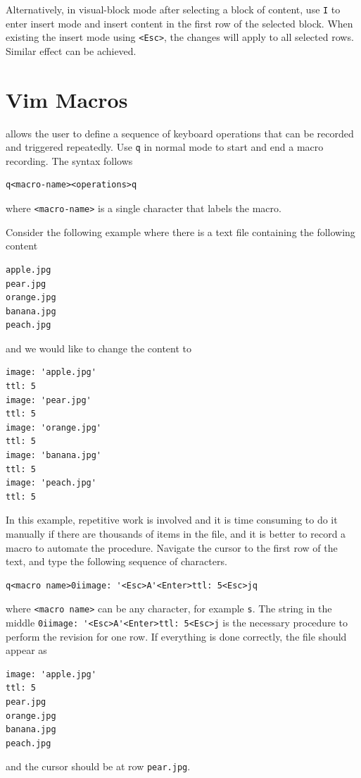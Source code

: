 Alternatively, in visual-block mode after selecting a block of content, use \verb|I| to enter insert mode and insert content in the first row of the selected block. When existing the insert mode using \verb|<Esc>|, the changes will apply to all selected rows. Similar effect can be achieved.

\section{Vim Macros}

 allows the user to define a sequence of keyboard operations that can be recorded and triggered repeatedly. Use \verb|q| in normal mode to start and end a macro recording. The syntax follows
\begin{lstlisting}
q<macro-name><operations>q
\end{lstlisting}
where \verb|<macro-name>| is a single character that labels the macro.

Consider the following example where there is a text file containing the following content
\begin{lstlisting}
apple.jpg
pear.jpg
orange.jpg
banana.jpg
peach.jpg
\end{lstlisting}
and we would like to change the content to
\begin{lstlisting}
image: 'apple.jpg'
ttl: 5
image: 'pear.jpg'
ttl: 5
image: 'orange.jpg'
ttl: 5
image: 'banana.jpg'
ttl: 5
image: 'peach.jpg'
ttl: 5
\end{lstlisting}

In this example, repetitive work is involved and it is time consuming to do it manually if there are thousands of items in the file, and it is better to record a macro to automate the procedure. Navigate the cursor to the first row of the text, and type the following sequence of characters.
\begin{lstlisting}
q<macro name>0iimage: '<Esc>A'<Enter>ttl: 5<Esc>jq
\end{lstlisting}
where \verb|<macro name>| can be any character, for example \verb|s|. The string in the middle \verb|0iimage: '<Esc>A'<Enter>ttl: 5<Esc>j| is the necessary procedure to perform the revision for one row. If everything is done correctly, the file should appear as
\begin{lstlisting}
image: 'apple.jpg'
ttl: 5
pear.jpg
orange.jpg
banana.jpg
peach.jpg
\end{lstlisting}
and the cursor should be at row \verb|pear.jpg|.

